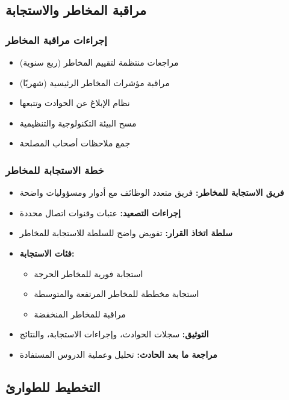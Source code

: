 \subsection{مراقبة المخاطر والاستجابة}

\subsubsection{إجراءات مراقبة المخاطر}
\begin{itemize}
    \item مراجعات منتظمة لتقييم المخاطر (ربع سنوية)
    \item مراقبة مؤشرات المخاطر الرئيسية (شهريًا)
    \item نظام الإبلاغ عن الحوادث وتتبعها
    \item مسح البيئة التكنولوجية والتنظيمية
    \item جمع ملاحظات أصحاب المصلحة
\end{itemize}

\subsubsection{خطة الاستجابة للمخاطر}
\begin{itemize}
    \item \textbf{فريق الاستجابة للمخاطر:} فريق متعدد الوظائف مع أدوار ومسؤوليات واضحة
    \item \textbf{إجراءات التصعيد:} عتبات وقنوات اتصال محددة
    \item \textbf{سلطة اتخاذ القرار:} تفويض واضح للسلطة للاستجابة للمخاطر
    \item \textbf{فئات الاستجابة:}
    \begin{itemize}
        \item استجابة فورية للمخاطر الحرجة
        \item استجابة مخططة للمخاطر المرتفعة والمتوسطة
        \item مراقبة للمخاطر المنخفضة
    \end{itemize}
    \item \textbf{التوثيق:} سجلات الحوادث، وإجراءات الاستجابة، والنتائج
    \item \textbf{مراجعة ما بعد الحادث:} تحليل وعملية الدروس المستفادة
\end{itemize}

\subsection{التخطيط للطوارئ}

